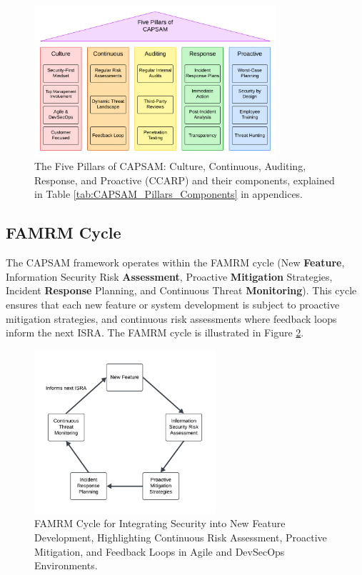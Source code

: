     \begin{figure}[htbp]
        \centering
        \includegraphics[width=0.8\textwidth]{figures/CAPSAM-Pillars.png}
        \caption{The Five Pillars of CAPSAM: Culture, Continuous, Auditing, Response, and Proactive (CCARP) and their components, explained in Table \ref{tab:CAPSAM_Pillars_Components} in appendices.}
        \label{fig:CAPSAM_Pillars}
    \end{figure}

    \subsection{FAMRM Cycle}
    The CAPSAM framework operates within the FAMRM cycle (New \textbf{Feature}, Information Security Risk \textbf{Assessment}, Proactive \textbf{Mitigation} Strategies, Incident \textbf{Response} Planning, and Continuous Threat \textbf{Monitoring}). This cycle ensures that each new feature or system development is subject to proactive mitigation strategies, and continuous risk assessments where feedback loops inform the next ISRA. The FAMRM cycle is illustrated in Figure \ref{fig:FAMRM_Cycle}.

    \begin{figure}[htbp]
        \centering
        \includegraphics[width=0.6\textwidth]{figures/FAMRM-Cycle.png}
        \caption{FAMRM Cycle for Integrating Security into New Feature Development, Highlighting Continuous Risk Assessment, Proactive Mitigation, and Feedback Loops in Agile and DevSecOps Environments.}
        \label{fig:FAMRM_Cycle}
    \end{figure}

